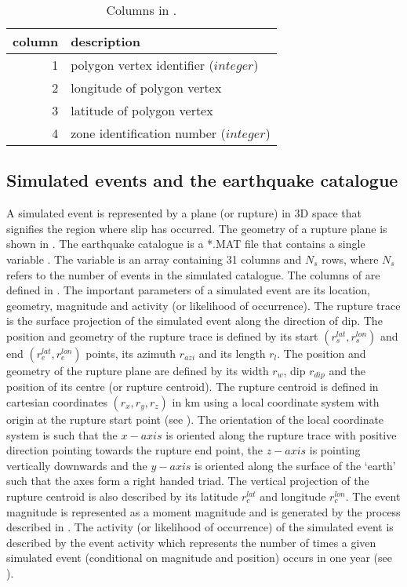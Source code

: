 \begin{table}
\centering \caption{Columns in
.}\label{tab:site-loc-par-sourcepolys}
\vspace{0.8em}
\begin{tabular}{r|l}
 \hline
column & description \\
\hline 1 & polygon vertex identifier ($integer$)\\
2 & longitude of polygon vertex \\
3 & latitude of polygon vertex \\
4 & zone identification number ($integer$) \\
 \hline
\end{tabular}
\end{table}

\subsection{Simulated events and the earthquake catalogue}
\label{sec:event-catalogue}

A simulated event is represented by a plane
(or rupture) in 3D space that signifies the region where slip has
occurred. The geometry of a rupture plane is shown in
. The earthquake catalogue is a *.MAT file
that contains a single variable . The variable
 is an array containing 31 columns and $N_s$
rows, where $N_s$ refers to the number of events in the simulated
catalogue. The columns of  are defined in
. The important parameters of a simulated
event are its location, geometry, magnitude
and activity (or likelihood of occurrence). The rupture trace is
the surface projection of the simulated event along the direction of dip. The position and geometry of
the rupture trace is defined by its start $(r_s^{lat},r_s^{lon})$
and end $(r_e^{lat},r_e^{lon})$ points, its azimuth $r_{azi}$ and
its length $r_l$. The position and geometry of the rupture plane
are defined by its width $r_w$, dip $r_{dip}$ and the position of
its centre (or rupture centroid). The rupture centroid is defined
in cartesian coordinates $(r_x,r_y,r_z)$ in km using a local
coordinate system with origin at the rupture start point (see
). The orientation of the local coordinate
system is such that the $x-axis$ is oriented along the rupture
trace with positive direction pointing towards the rupture end
point, the $z-axis$ is pointing vertically downwards and the
$y-axis$ is oriented along the surface of the `earth' such that
the axes form a right handed triad. The vertical projection of the
rupture centroid is also described by its latitude $r_c^{lat}$ and
longitude $r_c^{lon}$. The event magnitude is represented as a
moment magnitude and is generated by the process described in
. The activity (or likelihood of
occurrence) of the simulated event is
described by the event activity which represents the number of
times a given simulated event (conditional
on magnitude and position) occurs in one year (see
).


